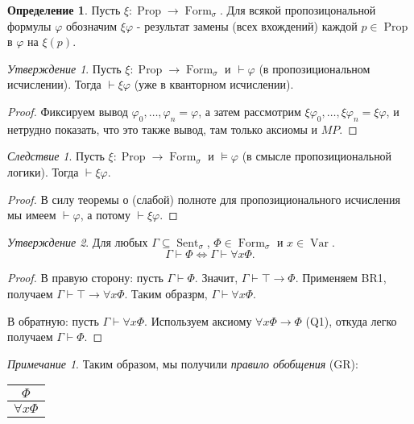 \documentclass[a4paper,100pt]{article}
\theoremstyle{indented}
\theoremstyle{definition}
\newtheorem{defn}{Определение}
\theoremstyle{remark}
\newtheorem{remark}{Примечание}
\newtheorem{cons}{Следствие}
\newtheorem{stat}{Утверждение}
\DeclareMathOperator{\ra}{\rightarrow}
\DeclareMathOperator{\Prop}{Prop}
\DeclareMathOperator{\form}{Form}
\DeclareMathOperator{\Var}{Var}
\DeclareMathOperator{\Sent}{Sent}
\begin{document}
\begin{defn}
  Пусть $\xi: \Prop \rightarrow \form_\sigma$. Для всякой пропозицональной формулы $\varphi$ обозначим $\xi \varphi$ - результат замены (всех вхождений) каждой $p\in \Prop$ в $\varphi$ на $\xi(p)$. 
\end{defn}

\begin{stat}
  Пусть $\xi: \Prop \ra \form_\sigma$ и $\vdash \varphi$ (в пропозициональном исчислении). Тогда $\vdash \xi\varphi$ (уже в кванторном исчислении).
\end{stat}

\begin{proof}
  Фиксируем вывод $\varphi_0, \ldots, \varphi_n = \varphi$, а затем рассмотрим $\xi\varphi_0, \ldots, \xi\varphi_n = \xi\varphi$, и нетрудно показать, что это также вывод, там только аксиомы и $MP$. 
\end{proof}

\begin{cons}
  Пусть $\xi: \Prop \ra \form_\sigma$ и $\vDash \varphi$ (в смысле пропозициональной логики). Тогда $\vdash \xi \varphi$. 
\end{cons}

\begin{proof}
  В силу теоремы о (слабой) полноте для пропозиционального исчисления мы имеем $\vdash \varphi$, а потому $\vdash \xi \varphi$. 
\end{proof}

\begin{stat}
  Для любых $\Gamma \subseteq \Sent_\sigma$, $\Phi \in \form_\sigma$ и $x\in \Var$. 
  \[
    \Gamma \vdash \Phi \Longleftrightarrow \Gamma \vdash \forall x \Phi. 
  \]
\end{stat}

\begin{proof}
  В правую сторону: пусть $\Gamma \vdash \Phi$. Значит, $\Gamma \vdash \top \ra \Phi$. Применяем BR1, получаем $\Gamma \vdash \top \ra \forall x \Phi$. Таким образрм, $\Gamma \vdash \forall x \Phi$. \ 

  В обратную: пусть $\Gamma \vdash \forall x \Phi$. Используем аксиому $\forall x \Phi \ra \Phi$ (Q1), откуда легко получаем $\Gamma \vdash \Phi$. 
\end{proof}

\begin{remark}
  Таким образом, мы получили \textit{правило обобщения} (GR):

  \begin{center}
    \begin{tabular}{c}
      $\Phi$ \\ 
      \hline
      $\forall x \Phi$ 
    \end{tabular}
  \end{center}
\end{remark}
\end{document}
